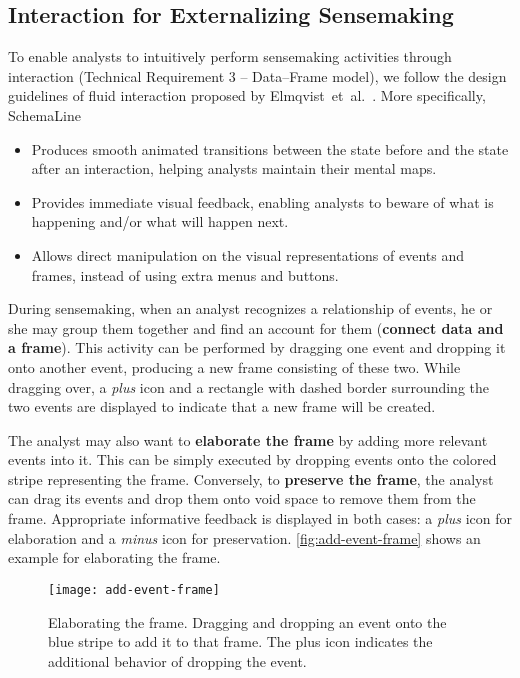 \subsection{Interaction for Externalizing Sensemaking}
To enable analysts to intuitively perform sensemaking activities through interaction (Technical Requirement 3 -- Data--Frame model), we follow the design guidelines of fluid interaction proposed by Elmqvist~et~al.~\cite{Elmqvist2011}. More specifically, SchemaLine
\begin{itemize}
	\item Produces smooth animated transitions between the state before and the state after an interaction, helping analysts maintain their mental maps.
	\item Provides immediate visual feedback, enabling analysts to beware of what is happening and/or what will happen next.
	\item Allows direct manipulation on the visual representations of events and frames, instead of using extra menus and buttons.
\end{itemize}

During sensemaking, when an analyst recognizes a relationship of events, he or she may group them together and find an account for them (\textbf{connect data and a frame}). This activity can be performed by dragging one event and dropping it onto another event, producing a new frame consisting of these two. While dragging over, a \emph{plus} icon and a rectangle with dashed border surrounding the two events are displayed to indicate that a new frame will be created.

The analyst may also want to \textbf{elaborate the frame} by adding more relevant events into it. This can be simply executed by dropping events onto the colored stripe representing the frame. Conversely, to \textbf{preserve the frame}, the analyst can drag its events and drop them onto void space to remove them from the frame. Appropriate informative feedback is displayed in both cases: a \emph{plus} icon for elaboration and a \emph{minus} icon for preservation. \autoref{fig:add-event-frame} shows an example for elaborating the frame.

\begin{figure}
	\centering
	\texttt{[image: add-event-frame]}
	\caption[Elaborating the frame]{Elaborating the frame. Dragging and dropping an event onto the blue stripe to add it to that frame. The plus icon indicates the additional behavior of dropping the event.}
	\label{fig:add-event-frame}
\end{figure}

